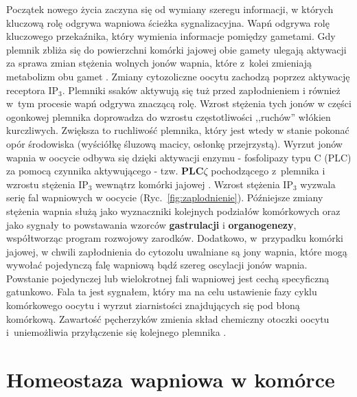 Początek nowego życia zaczyna się od wymiany szeregu informacji, w których kluczową rolę odgrywa wapniowa ścieżka sygnalizacyjna. Wapń odgrywa rolę kluczowego przekaźnika, który wymienia informacje pomiędzy gametami. Gdy plemnik zbliża się do powierzchni komórki jajowej obie gamety ulegają aktywacji za sprawa zmian stężenia wolnych jonów wapnia, które z~kolei zmieniają metabolizm obu gamet \cite{Campbell2006}. Zmiany cytozoliczne oocytu zachodzą poprzez aktywację receptora IP$_3$. Plemniki ssaków aktywują się tuż przed zapłodnieniem i również w~tym procesie wapń odgrywa znaczącą rolę. Wzrost stężenia tych jonów w części ogonkowej plemnika doprowadza do wzrostu częstotliwości ,,ruchów'' włókien kurczliwych. Zwiększa to ruchliwość plemnika, który jest wtedy w stanie pokonać opór środowiska (wyściółkę śluzową macicy, osłonkę przejrzystą). Wyrzut jonów wapnia w oocycie odbywa się dzięki aktywacji enzymu - fosfolipazy typu C (PLC) za pomocą czynnika aktywującego - tzw. \textbf{PLC$\zeta$} pochodzącego z~plemnika i wzrostu stężenia IP$_3$ wewnątrz komórki jajowej \cite{Swann2013,Yu2012}. Wzrost stężenia IP$_3$ wyzwala serię fal wapniowych w oocycie (Ryc.~\ref{fig:zaplodnienie}). Późniejsze zmiany stężenia wapnia służą jako wyznaczniki kolejnych podziałów komórkowych oraz jako sygnały to powstawania wzorców \textbf{gastrulacji} i \textbf{organogenezy}, współtworząc program rozwojowy zarodków. Dodatkowo, w~przypadku komórki jajowej, w chwili zapłodnienia do cytozolu uwalniane są jony wapnia, które mogą wywołać pojedynczą falę wapniową bądź szereg oscylacji jonów wapnia. Powstanie pojedynczej lub wielokrotnej fali wapniowej jest cechą specyficzną gatunkowo. Fala ta jest sygnałem, który ma na celu ustawienie fazy cyklu komórkowego oocytu i wyrzut ziarnistości znajdujących się pod błoną komórkową. Zawartość pęcherzyków zmienia skład chemiczny otoczki oocytu i~uniemożliwia przyłączenie się kolejnego plemnika \cite{Gonzalez-Garcia2013,Swann2008}.

\section{Homeostaza wapniowa w komórce}



